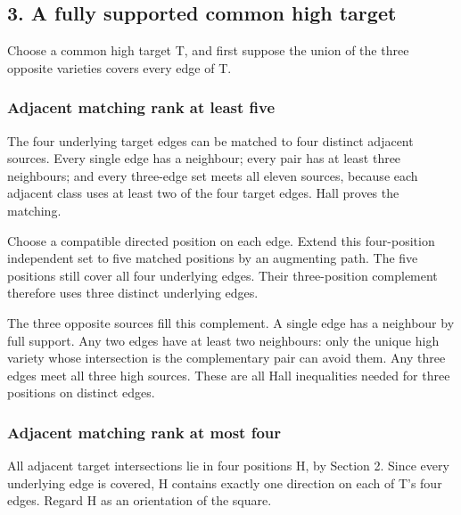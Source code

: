 \documentclass[
  10pt,
]{article}
\begin{document}
\hypertarget{a-fully-supported-common-high-target}{%
\subsection*{3. A fully supported common high
target}\label{a-fully-supported-common-high-target}}

Choose a common high target T, and first suppose the union of the three
opposite varieties covers every edge of T.

\hypertarget{adjacent-matching-rank-at-least-five}{%
\subsubsection*{Adjacent matching rank at least
five}\label{adjacent-matching-rank-at-least-five}}

The four underlying target edges can be matched to four distinct
adjacent sources. Every single edge has a neighbour; every pair has at
least three neighbours; and every three-edge set meets all eleven
sources, because each adjacent class uses at least two of the four
target edges. Hall proves the matching.

Choose a compatible directed position on each edge. Extend this
four-position independent set to five matched positions by an augmenting
path. The five positions still cover all four underlying edges. Their
three-position complement therefore uses three distinct underlying
edges.

The three opposite sources fill this complement. A single edge has a
neighbour by full support. Any two edges have at least two neighbours:
only the unique high variety whose intersection is the complementary
pair can avoid them. Any three edges meet all three high sources. These
are all Hall inequalities needed for three positions on distinct edges.

\hypertarget{adjacent-matching-rank-at-most-four}{%
\subsubsection*{Adjacent matching rank at most
four}\label{adjacent-matching-rank-at-most-four}}

All adjacent target intersections lie in four positions H, by Section 2.
Since every underlying edge is covered, H contains exactly one direction
on each of T's four edges. Regard H as an orientation of the square.
\end{document}
